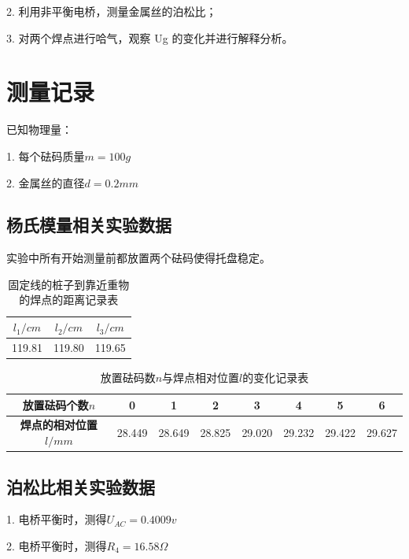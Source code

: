 \documentclass[a4paper,UTF8]{ctexart}
\begin{document}
2. 利用非平衡电桥，测量金属丝的泊松比；

3. 对两个焊点进行哈气，观察 Ug 的变化并进行解释分析。

\section{测量记录}

已知物理量：

1. 每个砝码质量$m = 100g$

2. 金属丝的直径$d = 0.2mm$

\subsection{杨氏模量相关实验数据}

实验中所有开始测量前都放置两个砝码使得托盘稳定。

\begin{table}[!hp]
    \begin{center}
    \begin{tabular}{|c|c|c|}
    \hline
    $l_1/cm$ & $l_2/cm$ & $l_3/cm$ \\
    \hline
    119.81 & 119.80 & 119.65 \\
    \hline
    \end{tabular}
    \end{center}
    \caption{固定线的桩子到靠近重物的焊点的距离记录表}
\end{table}

\begin{table}[!hp]
    \begin{center}
    \begin{tabular}{|c|c|c|c|c|c|c|c|}
    \hline
    \bfseries 放置砝码个数$n$ & 0 & 1 & 2 & 3 & 4 & 5 & 6 \\
    \hline
    \bfseries 焊点的相对位置$l/mm$ & 28.449 & 28.649 & 28.825 & 29.020 & 29.232 & 29.422 & 29.627 \\
    \hline
    \end{tabular}
    \end{center}
    \caption{放置砝码数$n$与焊点相对位置$l$的变化记录表}
\end{table}

\subsection{泊松比相关实验数据}

1. 电桥平衡时，测得$U_{AC} = 0.4009v$

2. 电桥平衡时，测得$R_4 = 16.58 \Omega$
\end{document}
